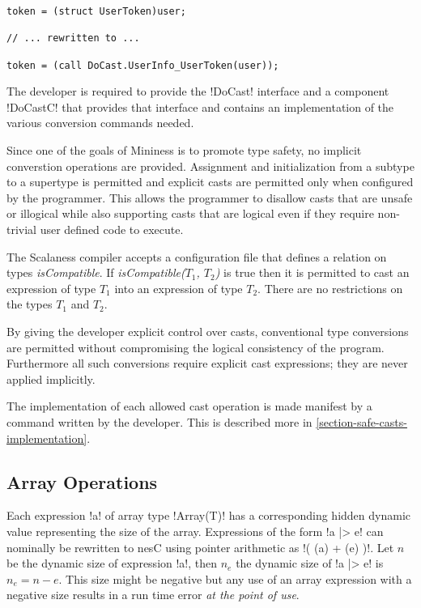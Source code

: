 \singlespace
\begin{lstlisting}[language=nesC]
token = (struct UserToken)user;

// ... rewritten to ...

token = (call DoCast.UserInfo_UserToken(user));
\end{lstlisting}
\primaryspacing

The developer is required to provide the !DoCast! interface and a component !DoCastC! that
provides that interface and contains an implementation of the various conversion commands
needed.

Since one of the goals of Mininess is to promote type safety, no implicit converstion operations
are provided. Assignment and initialization from a subtype to a supertype is permitted and
explicit casts are permitted only when configured by the programmer. This allows the programmer
to disallow casts that are unsafe or illogical while also supporting casts that are logical even
if they require non-trivial user defined code to execute.

The Scalaness compiler accepts a configuration file that defines a relation on types
\textit{isCompatible}. If \textit{isCompatible($T_1$, $T_2$)} is true then it is permitted to
cast an expression of type $T_1$ into an expression of type $T_2$. There are no restrictions on
the types $T_1$ and $T_2$.

By giving the developer explicit control over casts, conventional type conversions are permitted
without compromising the logical consistency of the program. Furthermore all such conversions
require explicit cast expressions; they are never applied implicitly.

The implementation of each allowed cast operation is made manifest by a command written by the
developer. This is described more in \autoref{section-safe-casts-implementation}.


\subsection{Array Operations}
\label{section-array-operations-implementation}

Each expression !a! of array type !Array(T)! has a corresponding hidden dynamic value
representing the size of the array. Expressions of the form !a |> e! can nominally be rewritten
to nesC using pointer arithmetic as !( (a) + (e) )!. Let $n$ be the dynamic size of expression
!a!, then $n_e$ the dynamic size of !a |> e! is $n_e = n - e$. This size might be negative but
any use of an array expression with a negative size results in a run time error \emph{at the
  point of use}.

